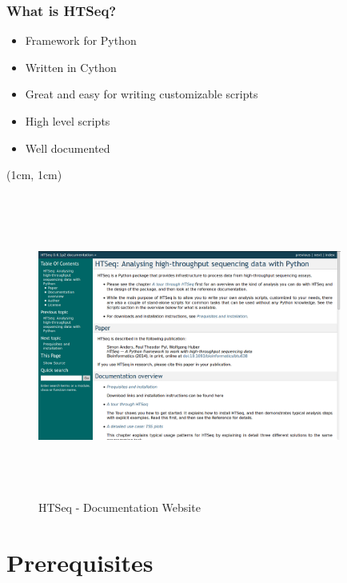 \documentclass{beamer}
\begin{document}
\begin{frame}
    \frametitle{What is HTSeq?}
     {
        \begin{itemize}
            \item Framework for Python
            \item Written in Cython
            \item Great and easy for writing customizable scripts
            \item High level scripts
            \item Well documented
        \end{itemize}
    }
     {
        \begin{textblock*}{10cm}(1cm, 1cm)
            \begin{figure}
                \includegraphics[width=10cm,height=10cm,keepaspectratio]{img/website.png}
                \caption{HTSeq - Documentation Website}
            \end{figure}
        \end{textblock*} 
    }
\end{frame}

\section{Prerequisites}
\end{document}
